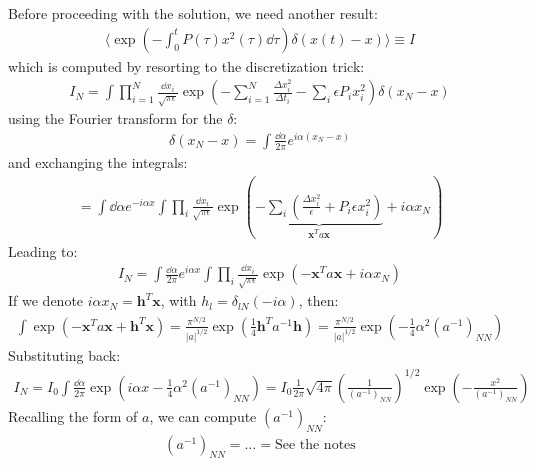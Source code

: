 \documentclass[../template.tex]{subfiles}
\begin{document}
Before proceeding with the solution, we need another result:
\begin{align*}
    \langle \exp\left(-\int_0^t P(\tau) x^2(\tau) \dd{\tau}\right) \delta(x(t) - x) \rangle \equiv I
\end{align*}
which is computed by resorting to the discretization trick:
\begin{align*}
    I_N = \int \prod_{i=1}^N \frac{\dd{x_i}}{\sqrt{\pi \epsilon}} \exp\left(-\sum_{i=1}^N \frac{\Delta x_i^2}{\Delta t_i} - \sum_i \epsilon P_i x_i^2 \right) \delta(x_N - x)
\end{align*}
using the Fourier transform for the $\delta$:
\begin{align*}
    \delta(x_N - x) = \int \frac{\dd{\alpha}}{2 \pi} e^{i \alpha (x_N - x)} 
\end{align*} 
and exchanging the integrals:
\begin{align*}
    = \int \dd{\alpha} e^{-i \alpha x} \int \prod_i \frac{\dd{x_i}}{\sqrt{\pi \epsilon}} \exp\left(\underbrace{-\sum_i \left(\frac{\Delta x_i^2}{\epsilon} + P_i \epsilon x_i^2 \right) }_{\bm{x}^T a \bm{x}}+ i \alpha x_N\right)
\end{align*}
Leading to:
\begin{align*}
    I_N = \int \frac{\dd{\alpha}}{2 \pi} e^{i \alpha x} \int \prod_i \frac{\dd{x_i}}{\sqrt{\pi \epsilon}} \exp(-\bm{x}^T a \bm{x} + i \alpha x_N)  
\end{align*}
If we denote $i \alpha x_N = \bm{h}^T \bm{x}$, with $h_l = \delta_{lN} (-i \alpha)$, then:
\begin{align*}
    \int \exp(-\bm{x}^T a \bm{x} + \bm{h}^T \bm{x}) = \frac{\pi^{N/2}}{|a|^{1/2}}\exp\left(\frac{1}{4} \bm{h}^T a^{-1}\bm{h} \right) = \frac{\pi^{N/2}}{|a|^{1/2}} \exp\left(-\frac{1}{4}\alpha^2 (a^{-1})_{NN} \right)  
\end{align*}
Substituting back:
\begin{align*}
    I_N = I_0 \int \frac{\dd{\alpha}}{2 \pi} \exp\left(i \alpha x - \frac{1}{4} \alpha^2 (a^{-1})_{NN}\right)  = I_0 \frac{1}{2 \pi} \sqrt{4 \pi} \left(\frac{1}{(a^{-1})_{NN}} \right)^{1/2} \exp\left(-\frac{x^2}{(a^{-1})_{NN}} \right) 
\end{align*}
Recalling the form of $a$, we can compute $(a^{-1})_{NN}$:
\begin{align*}
    (a^{-1})_{NN} = \dots = \text{See the notes}
\end{align*}  
\end{document}
